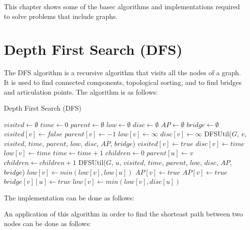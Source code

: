 This chapter shows some of the basec algorithms and implementations required to solve problems that include graphs.

\section{Depth First Search (DFS)}

The DFS algorithm is a recursive algorithm that visits all the nodes of a graph. It is used to find connected components, topological sorting, and to find bridges and articulation points. The algorithm is as follows:

\begin{algorithm}
\caption{Depth First Search (DFS)}
\label{alg:dfs}
\begin{algorithmic}[1]
\State $visited \gets \emptyset$
\State $time \gets 0$
\State $parent \gets \emptyset$
\State $low \gets \emptyset$
\State $disc \gets \emptyset$
\State $AP \gets \emptyset$
\State $bridge \gets \emptyset$
\State $visited[v] \gets false$
\State $parent[v] \gets -1$
\State $low[v] \gets \infty$
\State $disc[v] \gets \infty$
\EndFor
{}
\State DFSUtil($G$, $v$, $visited$, $time$, $parent$, $low$, $disc$, $AP$, $bridge$)
\EndIf
\EndFor
\EndProcedure
{}
\State $visited[v] \gets true$
\State $disc[v] \gets time$
\State $low[v] \gets time$
\State $time \gets time + 1$
\State $children \gets 0$
\State $parent[u] \gets v$
\State $children \gets children + 1$
\State DFSUtil($G$, $u$, $visited$, $time$, $parent$, $low$, $disc$, $AP$, $bridge$)
\State $low[v] \gets min(low[v], low[u])$
\State $AP[v] \gets true$
\EndIf
{}
\State $AP[v] \gets true$
\EndIf
{}
\State $bridge[v][u] \gets true$
\EndIf
\Else
\State $low[v] \gets min(low[v], disc[u])$
\EndIf
\EndFor
\EndProcedure
\end{algorithmic}
\end{algorithm}

The implementation can be done as follows:



An application of this algorithm in order to find the shorteast path between two nodes can be done as follows:




